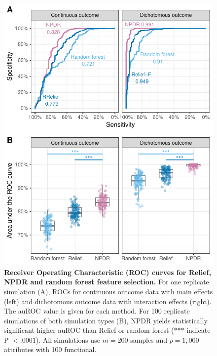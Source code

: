 \documentclass{article}
\begin{document}
\begin{figure}[h]%
\centerline{\includegraphics[]{../figs/roc_compare_100.pdf}}
\caption{\textbf{Receiver Operating Characteristic (ROC) curves for Relief, NPDR and random forest feature selection.} For one replicate simulation (A), ROCs for continuous outcome data with main effects (left) and dichotomous outcome data with interaction effects (right). The auROC value is given for each method. For 100 replicate simulations of both simulation types (B), NPDR yields statistically significant higher auROC than Relief or random forest ($\ast$$\ast$$\ast$ indicate P $<.0001$). All simulations use $m = 200$ samples and $p = 1,000$ attributes with 100 functional.}
\label{fig:auROC}
\end{figure}
\end{document}
